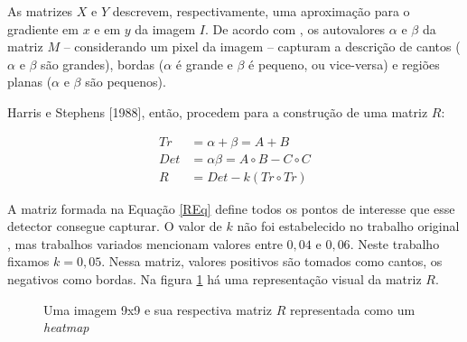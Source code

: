 \documentclass[12pt]{article}
\begin{document}
As matrizes $X$ e $Y$ descrevem, respectivamente, uma aproximação para
o  gradiente  em  $x$  e  em   $y$  da  imagem  $I$.   De  acordo  com
\cite{harris},  os autovalores  $\alpha$ e  $\beta$ da  matriz  $M$ --
considerando  um pixel  da imagem  -- capturam  a descrição  de cantos
($\alpha$ e $\beta$ são grandes),  bordas ($\alpha$ é grande e $\beta$
é pequeno,  ou vice-versa)  e regiões planas  ($\alpha$ e  $\beta$ são
pequenos).

Harris e  Stephens [1988],  então, procedem para  a construção  de uma
matriz $R$:  %

\begin{align}
  Tr & = \alpha + \beta = A + B \nonumber \\
  Det & = \alpha \beta = A \circ B - C \circ C \nonumber \\
  R & = Det - k (Tr \circ Tr) \label{REq}
\end{align}

A  matriz formada  na  Equação  \ref{REq} define  todos  os pontos  de
interesse que esse detector consegue  capturar. O valor de $k$ não foi
estabelecido  no   trabalho  original  \cite{harris},   mas  trabalhos
variados \cite{detectors, statharris} mencionam valores entre $0,04$ e
$0,06$.   Neste trabalho fixamos  $k =  0,05$.  Nessa  matriz, valores
positivos são tomados como cantos, os negativos como bordas. Na figura
\ref{figR} há uma representação visual da matriz $R$.

\begin{figure}[h]
  \centering
  \quad
  \caption{Uma imagem 9x9 e sua respectiva matriz $R$ representada
    como um \textit{heatmap}\label{figR}}
\end{figure}
\end{document}
